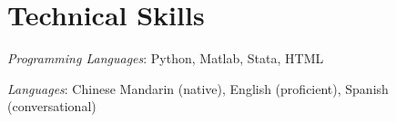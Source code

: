 
\section{Technical Skills} %
\label{sec:technical_ski}
\vspace{-0.25in}
\begin{outerlist}
	\item {\it Programming Languages}: Python, Matlab, Stata, HTML
	\item {\it Languages}: Chinese Mandarin (native), English (proficient), Spanish (conversational)
\end{outerlist}